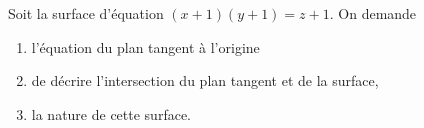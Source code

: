 \begin{exercice}\label{exoFoncDeuxVar0006}

Soit la surface d'équation $(x+1)(y+1)=z+1$. On demande
\begin{enumerate}

\item
l'équation du plan tangent à l'origine
\item
de décrire l'intersection du plan tangent et de la surface,
\item
la nature de cette surface.

\end{enumerate}

\end{exercice}
